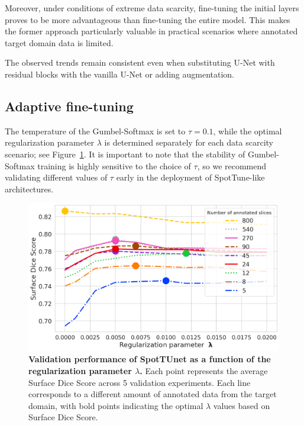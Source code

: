 Moreover, under conditions of extreme data scarcity, fine-tuning the initial layers proves to be more advantageous than fine-tuning the entire model. This makes the former approach particularly valuable in practical scenarios where annotated target domain data is limited.


The observed trends remain consistent even when substituting U-Net with residual blocks with the vanilla U-Net or adding augmentation. %


\subsection{Adaptive fine-tuning}


The temperature of the Gumbel-Softmax is set to $\tau = 0.1$, while the optimal regularization parameter $\lambda$ is determined separately for each data scarcity scenario; see Figure~\ref{fig:lambda}. It is important to note that the stability of Gumbel-Softmax training is highly sensitive to the choice of $\tau$, so we recommend validating different values of $\tau$ early in the deployment of SpotTune-like architectures.

\begin{figure}[h]
	\centering
	\includegraphics[width=\textwidth]{Dissertation/Figures/2_mri/k_reg.png}
	\caption{\textbf{Validation performance of SpotTUnet as a function of the regularization parameter $\lambda$.} Each point represents the average Surface Dice Score across 5 validation experiments. Each line corresponds to a different amount of annotated data from the target domain, with bold points indicating the optimal $\lambda$ values based on Surface Dice Score.}
	\label{fig:lambda}
\end{figure}

